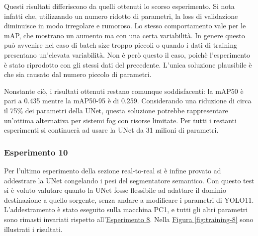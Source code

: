 \documentclass[12pt]{report}
\begin{document}
Questi risultati differiscono da quelli ottenuti lo scorso esperimento. Si nota infatti che, utilizzando un numero ridotto di parametri, la loss di validazione diminuisce in modo irregolare e rumoroso. Lo stesso comportamento vale per le mAP, che mostrano un aumento ma con una certa variabilità. In genere questo può avvenire nel caso di batch size troppo piccoli o quando i dati di training presentano un'elevata variabilità. Non è però questo il caso, poichè l'esperimento è stato riprodotto con gli stessi dati del precedente. L'unica soluzione plausibile è che sia causato dal numero piccolo di parametri.

Nonstante ciò, i risultati ottenuti restano comunque soddisfacenti: la mAP50 è pari a 0.435 mentre la mAP50-95 è di 0.259. Considerando una riduzione di circa il 75\% dei parametri della UNet, questa soluzione potrebbe rappresentare un'ottima alternativa per sistemi fog con risorse limitate. Per tutti i restanti esperimenti si continuerà ad usare la UNet da 31 milioni di parametri.

\subsubsection{Esperimento 10}
\label{sec:esperimento_10}

Per l'ultimo esperimento della sezione real-to-real si è infine provato ad addestrare la UNet congelando i pesi del segmentatore semantico. Con questo test si è voluto valutare quanto la UNet fosse flessibile ad adattare il dominio destinazione a quello sorgente, senza andare a modificare i parametri di YOLO11. L'addestramento è stato eseguito sulla macchina PC1, e tutti gli altri parametri sono rimasti invariati rispetto all'\hyperref[sec:esperimento_8]{Esperimento 8}. Nella \hyperref[fig:training-8]{Figura \ref{fig:training-8}} sono illustrati i risultati.
\end{document}
